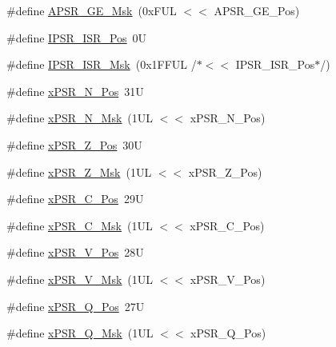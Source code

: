 \begin{DoxyCompactItemize}
\#define \mbox{\hyperlink{group___c_m_s_i_s___c_o_r_e_ga8a3ecbc0ea2029462b0f4ce50e227db1}{A\+P\+S\+R\+\_\+\+G\+E\+\_\+\+Msk}}~(0x\+F\+U\+L $<$$<$ A\+P\+S\+R\+\_\+\+G\+E\+\_\+\+Pos)
\item 
\#define \mbox{\hyperlink{group___c_m_s_i_s___c_o_r_e_ga0e34027584d02c43811ae908a5ca9adf}{I\+P\+S\+R\+\_\+\+I\+S\+R\+\_\+\+Pos}}~0U
\item 
\#define \mbox{\hyperlink{group___c_m_s_i_s___c_o_r_e_gaf013a4579a64d1f21f56ea9f1b33ab56}{I\+P\+S\+R\+\_\+\+I\+S\+R\+\_\+\+Msk}}~(0x1\+F\+F\+U\+L /$\ast$$<$$<$ I\+P\+S\+R\+\_\+\+I\+S\+R\+\_\+\+Pos$\ast$/)
\item 
\#define \mbox{\hyperlink{group___c_m_s_i_s___c_o_r_e_ga031eb1b8ebcdb3d602d0b9f2ec82a7ae}{x\+P\+S\+R\+\_\+\+N\+\_\+\+Pos}}~31U
\item 
\#define \mbox{\hyperlink{group___c_m_s_i_s___c_o_r_e_gaf600f4ff41b62cf2f3b0a59b6d2e93d6}{x\+P\+S\+R\+\_\+\+N\+\_\+\+Msk}}~(1\+U\+L $<$$<$ x\+P\+S\+R\+\_\+\+N\+\_\+\+Pos)
\item 
\#define \mbox{\hyperlink{group___c_m_s_i_s___c_o_r_e_ga5869dd608eea73c80f0567d781d2230b}{x\+P\+S\+R\+\_\+\+Z\+\_\+\+Pos}}~30U
\item 
\#define \mbox{\hyperlink{group___c_m_s_i_s___c_o_r_e_ga907599209fba99f579778e662021c4f2}{x\+P\+S\+R\+\_\+\+Z\+\_\+\+Msk}}~(1\+U\+L $<$$<$ x\+P\+S\+R\+\_\+\+Z\+\_\+\+Pos)
\item 
\#define \mbox{\hyperlink{group___c_m_s_i_s___c_o_r_e_ga14adb79b91f6634b351a1b57394e2db6}{x\+P\+S\+R\+\_\+\+C\+\_\+\+Pos}}~29U
\item 
\#define \mbox{\hyperlink{group___c_m_s_i_s___c_o_r_e_ga21e2497255d380f956ca0f48d11d0775}{x\+P\+S\+R\+\_\+\+C\+\_\+\+Msk}}~(1\+U\+L $<$$<$ x\+P\+S\+R\+\_\+\+C\+\_\+\+Pos)
\item 
\#define \mbox{\hyperlink{group___c_m_s_i_s___c_o_r_e_gae0cfbb394490db402623d97e6a979e00}{x\+P\+S\+R\+\_\+\+V\+\_\+\+Pos}}~28U
\item 
\#define \mbox{\hyperlink{group___c_m_s_i_s___c_o_r_e_gab07f94ed3b6ee695f5af719dc27995c2}{x\+P\+S\+R\+\_\+\+V\+\_\+\+Msk}}~(1\+U\+L $<$$<$ x\+P\+S\+R\+\_\+\+V\+\_\+\+Pos)
\item 
\#define \mbox{\hyperlink{group___c_m_s_i_s___c_o_r_e_gaabb4178d50676a8f19cf8f727f38ace8}{x\+P\+S\+R\+\_\+\+Q\+\_\+\+Pos}}~27U
\item 
\#define \mbox{\hyperlink{group___c_m_s_i_s___c_o_r_e_ga133ac393c38559ae43ac36383e731dd4}{x\+P\+S\+R\+\_\+\+Q\+\_\+\+Msk}}~(1\+U\+L $<$$<$ x\+P\+S\+R\+\_\+\+Q\+\_\+\+Pos)
\item 

\end{DoxyCompactItemize}

